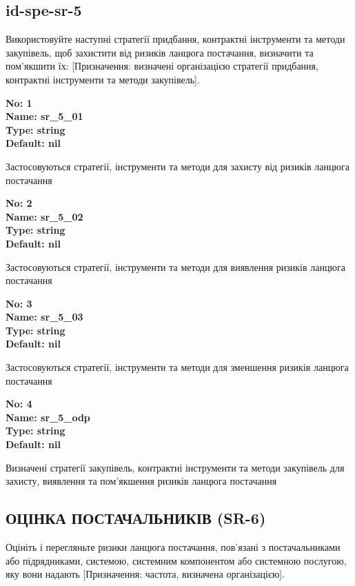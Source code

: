 \documentclass{article}
\begin{document}
\subsection{id-spe-sr-5}
Використовуйте наступні стратегії придбання, контрактні інструменти та методи закупівель, щоб захистити від ризиків ланцюга постачання, визначити та пом'якшити їх: [Призначення: визначені організацією стратегії придбання, контрактні інструменти та методи закупівель].

\vspace{10pt}
{\footnotesize\bfseries
No: 1\\
Name: sr\_\allowbreak{}5\_\allowbreak{}01\\
Type: string\\
Default: nil
}

{\footnotesize Застосовуються стратегії, інструменти та методи для захисту від ризиків ланцюга постачання}


{\footnotesize\bfseries
No: 2\\
Name: sr\_\allowbreak{}5\_\allowbreak{}02\\
Type: string\\
Default: nil
}

{\footnotesize Застосовуються стратегії, інструменти та методи для виявлення ризиків ланцюга постачання}


{\footnotesize\bfseries
No: 3\\
Name: sr\_\allowbreak{}5\_\allowbreak{}03\\
Type: string\\
Default: nil
}

{\footnotesize Застосовуються стратегії, інструменти та методи для зменшення ризиків ланцюга постачання}


{\footnotesize\bfseries
No: 4\\
Name: sr\_\allowbreak{}5\_\allowbreak{}odp\\
Type: string\\
Default: nil
}

{\footnotesize Визначені стратегії закупівель, контрактні інструменти та методи закупівель для захисту, виявлення та пом'якшення ризиків ланцюга постачання}




\subsection{ОЦІНКА ПОСТАЧАЛЬНИКІВ (SR-6)}
Оцініть і перегляньте ризики ланцюга постачання, пов'язані з постачальниками або підрядниками, системою, системним компонентом або системною послугою, яку вони надають [Призначення: частота, визначена організацією].
\end{document}
